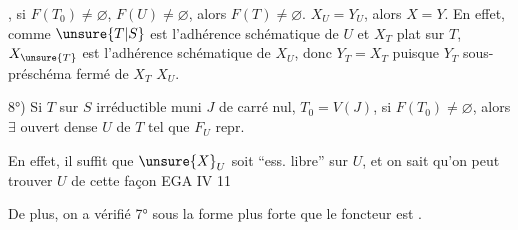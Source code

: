 
, si $F(T_0)\ne\varnothing$, $F(U)\ne\varnothing$, alors \deleted{$\unsure{\times}$} $F(T)\ne\varnothing$.   $X_U=Y_U$, alors $X=Y$. En effet, comme $\unsure{T|S}$ est l'adhérence schématique de $U$ et $X_T$ plat sur $T$, $X_{\unsure{T}}$ est l'adhérence schématique de $X_U$, donc  $Y_T=X_T$ puisque $Y_T$ sous-préschéma fermé de $X_T$  $X_U$.

8°) Si $T$ sur $S$ irréductible muni  $J$ de carré nul, $T_0=V(J)$, si $F(T_0)\ne\varnothing$,  alors $\exists$ ouvert dense $U$ de $T$  tel que $F_U$ repr.

En effet, il suffit que $\unsure{X}_U$ soit ``ess. libre'' sur $U$, et on sait qu'on peut trouver $U$ de cette façon EGA IV 11


De plus, on a vérifié 7° sous la forme plus forte  que le foncteur est .


